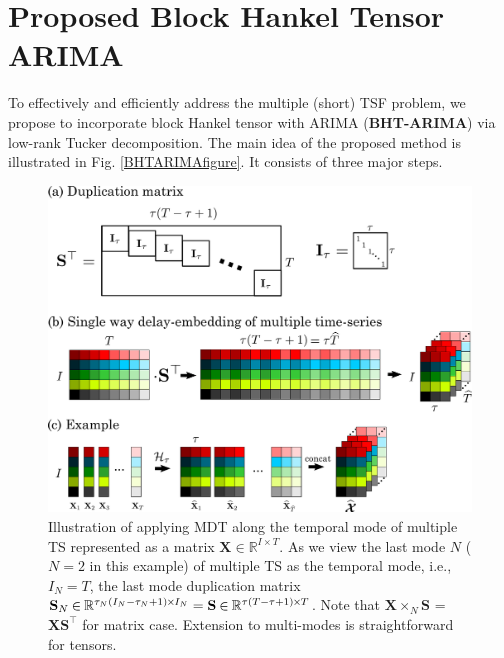 \documentclass[letterpaper]{article} %
\numberwithin{theorem}{section}
\newcommand{\bbR}[1]{\mathbb{R}^{#1}}
\begin{document}
\section{Proposed Block Hankel Tensor ARIMA}\label{sec:proposed}
To  effectively and efficiently address the multiple (short) TSF problem,
we  propose to  incorporate block Hankel tensor  with ARIMA (\textbf{BHT-ARIMA}) via low-rank Tucker decomposition. The main idea of the proposed method is illustrated in Fig. \ref{BHTARIMAfigure}. It consists of three major steps.


\begin{figure}[ttt!]
	\centering
	\includegraphics[width=0.9\columnwidth ]{Fig2_MDT_example.pdf}
	\caption{\label{MDTexample}Illustration of applying MDT along the temporal mode of multiple TS  represented  as a matrix $\mathbf{X} \in \bbR{I \times T}$. As we view the last mode $N$ ($N=2$ in this example) of multiple TS as the  temporal mode, i.e., $I_N =T$, the last mode  duplication matrix   $\mathbf S_N\hspace{-0.02cm}  \in \hspace{-0.02cm}  \mathbb{R}^{\tau_N (I_N-\tau_N+1) \hspace{-0.02cm}  \times\hspace{-0.02cm}  I_N} =  \mathbf S\hspace{-0.02cm}  \in \hspace{-0.02cm}  \mathbb{R}^{\tau(T-\tau+1) \hspace{-0.02cm}  \times\hspace{-0.02cm}  T}$. Note that  $\mathbf X \times_N \mathbf S$ =   $\mathbf X \mathbf S^\top$ for  matrix case.  Extension to multi-modes  is straightforward for tensors.}
\end{figure}
\end{document}
